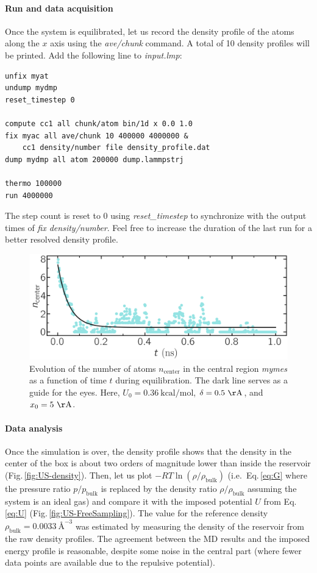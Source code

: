 \documentclass[9pt,tutorial]{livecoms}
\begin{document}
\paragraph{Run and data acquisition}
Once the system is equilibrated, let us record the density profile of
the atoms along the $x$ axis using
the \textit{ave/chunk} command. A total of 10 density profiles will be printed.
Add the following line to \textit{input.lmp}:
{\normalsize \begin{verbatim}
unfix myat
undump mydmp
reset_timestep 0

compute cc1 all chunk/atom bin/1d x 0.0 1.0
fix myac all ave/chunk 10 400000 4000000 &
    cc1 density/number file density_profile.dat
dump mydmp all atom 200000 dump.lammpstrj

thermo 100000
run 4000000
\end{verbatim}}
The step count is reset to 0 using \textit{reset\_timestep} to synchronize
with the output times of \textit{fix density/number}. Feel free to increase the
duration of the last run for a better resolved density profile.

\begin{figure}
\centering
\includegraphics[width=\linewidth]{US-density-evolution}
\caption{Evolution of the number of atoms $n_\text{center}$ in the central
region \textit{mymes} as a function of time $t$ during equilibration. The dark line
serves as a guide for the eyes. Here, $U_0 = 0.36~\text{kcal/mol}$,
$\delta = 0.5~\mathrm{\AA{}}$, and $x_0 = 5~\mathrm{\AA{}}$.}
\label{fig:US-density-evolution}
\end{figure}

\paragraph{Data analysis}

Once the simulation is over, the density profile shows that the density in the center of the box is
about two orders of magnitude lower than inside the reservoir (Fig.\,\ref{fig:US-density}).
Then, let us plot $-R T \ln(\rho/\rho_\mathrm{bulk})$ (i.e.~Eq.\,\eqref{eq:G} where
the pressure ratio $p/p_\mathrm{bulk}$ is replaced by the density ratio
$\rho/\rho_\mathrm{bulk}$ assuming the system is an ideal gas) and compare it
with the imposed potential $U$ from Eq.\,\eqref{eq:U} (Fig.\,\ref{fig:US-FreeSampling}).
The value for the reference density $\rho_\text{bulk} = 0.0033~\text{\AA{}}^{-3}$
was estimated by measuring the density of the reservoir from the raw density
profiles. The agreement between the MD results and the imposed energy profile
is reasonable, despite some noise in the central part (where fewer data points
are available due to the repulsive potential).
\end{document}
